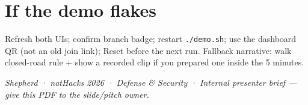 \documentclass[10pt]{extarticle}
\begin{document}
\section{If the demo flakes}
Refresh both UIs; confirm branch badge; restart \texttt{./demo.sh}; use the dashboard QR (not an old join link); Reset before the next run. Fallback narrative: walk closed-road rule + show a recorded clip if you prepared one inside the 5 minutes.

\vspace{8pt}
\begin{center}
\textit{Shepherd · natHacks 2026 · Defense \& Security · Internal presenter brief --- give this PDF to the slide/pitch owner.}
\end{center}
\end{document}
